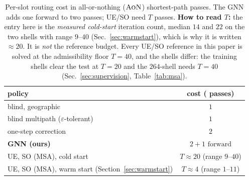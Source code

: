 \begin{table}[t]
  \centering\footnotesize\setlength{\tabcolsep}{3pt}
  \caption{Per-slot routing cost in all-or-nothing ($\textsc{AoN}$) shortest-path passes. The GNN adds
one forward to two passes; UE/SO need $T$ passes. \textbf{How to read $T$:} the entry
here is the \emph{measured cold-start} iteration count, median $14$ and $22$ on the two
shells with range $9$--$40$ (Sec.~\ref{sec:warmstart}), which is why it is written
$\approx 20$. It is \emph{not} the reference budget. Every UE/SO reference in this paper
is solved at the admissibility floor $T{=}40$, and the shells differ: the training shells
clear the test at $T{=}20$ and the $264$-shell needs $T{=}40$
(Sec.~\ref{sec:supervision}, Table~\ref{tab:msa}).}
  \label{tab:cost}
  
  \begin{tabular}{lc}
    \toprule
    policy & cost (\AoN{} passes) \\
    \midrule
    blind, geographic & $1$ \\
    blind multipath ($\varepsilon$-tolerant) & $1$ \\
    one-step correction & $2$ \\
    \textbf{GNN (ours)} & $2 + \text{1 forward}$ \\
    UE, SO (MSA), cold start & $T\approx 20$ (range $9$--$40$) \\
    UE, SO (MSA), warm start (Section~\ref{sec:warmstart}) & $T\approx 4$ (range $1$--$11$) \\
    \bottomrule
  \end{tabular}
\end{table}
